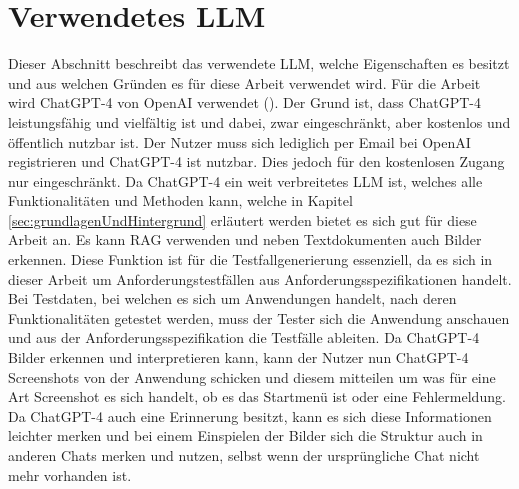\documentclass[12pt,toc=bib,toc=listof]{scrreprt}
\begin{document}
\section{Verwendetes LLM} %
\label{sec:verwendetesLLM}
Dieser Abschnitt beschreibt das verwendete LLM, welche Eigenschaften es besitzt und aus welchen Gründen es für diese Arbeit verwendet wird. Für die Arbeit wird ChatGPT-4 von OpenAI verwendet (\cite{OpenAI2025}). Der Grund ist, dass ChatGPT-4 leistungsfähig und vielfältig ist und dabei, zwar eingeschränkt, aber kostenlos und öffentlich nutzbar ist. Der Nutzer muss sich lediglich per Email bei OpenAI registrieren und ChatGPT-4 ist nutzbar. Dies jedoch für den kostenlosen Zugang nur eingeschränkt. Da ChatGPT-4 ein weit verbreitetes LLM ist, welches alle Funktionalitäten und Methoden kann, welche in Kapitel \ref{sec:grundlagenUndHintergrund} erläutert werden bietet es sich gut für diese Arbeit an. Es kann RAG verwenden und neben Textdokumenten auch Bilder erkennen. Diese Funktion ist für die Testfallgenerierung essenziell, da es sich in dieser Arbeit um Anforderungstestfällen aus Anforderungsspezifikationen handelt. Bei Testdaten, bei welchen es sich um Anwendungen handelt, nach deren Funktionalitäten getestet werden, muss der Tester sich die Anwendung anschauen und aus der Anforderungsspezifikation die Testfälle ableiten. Da ChatGPT-4 Bilder erkennen und interpretieren kann, kann der Nutzer nun ChatGPT-4 Screenshots von der Anwendung schicken und diesem mitteilen um was für eine Art Screenshot es sich handelt, ob es das Startmenü ist oder eine Fehlermeldung. Da ChatGPT-4 auch eine Erinnerung besitzt, kann es sich diese Informationen leichter merken und bei einem Einspielen der Bilder sich die Struktur auch in anderen Chats merken und nutzen, selbst wenn der ursprüngliche Chat nicht mehr vorhanden ist. 
\end{document}
